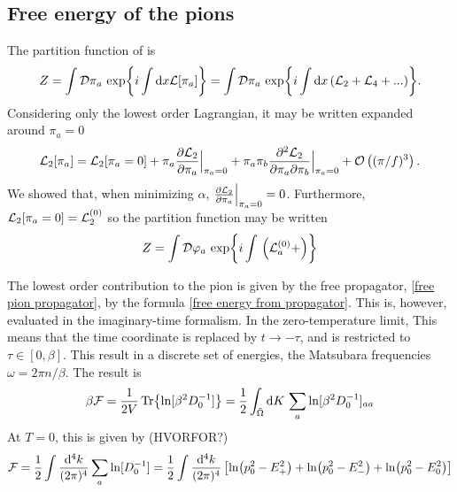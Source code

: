 \subsection{Free energy of the pions}
The partition function of \chpt is 
\begin{equation}
    Z = \int \D \pi_a \, \exp{i \int \dd x \Ell[\pi_a]}
    = 
    \int \D \pi_a \, \exp{i \int \dd x \left(\Ell_2 + \Ell_4 + ... \right)}.
\end{equation}
Considering only the lowest order Lagrangian, it may be written expanded around $\pi_a = 0$
\begin{equation}
    \Ell_2[\pi_a] 
    = \Ell_2[\pi_a = 0] 
    + \pi_a  \pdv{\Ell_2}{\pi_a}\Big|_{\pi_a=0}
    + \pi_a \pi_b \pdv[2]{\Ell_2}{\pi_a}{\pi_b}\Big|_{\pi_a=0}
    + \Oh[3]{(\pi/f)}.
\end{equation}
We showed that, when minimizing $\alpha$, $\pdv{\Ell_2}{\pi_a}\Big|_{\pi_a=0} = 0$. 
Furthermore, $\Ell_2[\pi_a = 0] = \Ell_2^{(0)}$ so the partition function may be written
\begin{equation}
    Z = \int \D \varphi_a \, 
    \exp{i \int \, \left( \Ell_a^{(0)} +  \right)}
\end{equation}


The lowest order contribution to the pion is given by the free propagator, \autoref{free pion propagator}, by the formula \autoref{free energy from propagator}.
This is, however, evaluated in the imaginary-time formalism.
In the zero-temperature limit, 
This means that the time coordinate is replaced by $t \rightarrow - \tau$, and is restricted to $\tau \in [0, \beta]$.
This result in a discrete set of energies, the Matsubara frequencies $\omega = 2 \pi n / \beta$.
The result is
\begin{equation}
    \beta \Ef = \frac{1}{2V} \Tr{\ln[\beta^2 D_0^{-1}]} 
    = \frac{1}{2} \int_{\tilde \Omega} \dd K \, \sum_a \ln[\beta^2 D_0^{-1}]_{aa}
\end{equation}
At $T = 0$, this is given by (HVORFOR?)
\begin{equation}
    \Ef = \frac{1}{2} \int \frac{\dd^4 k}{(2 \pi)^4} \sum_a \ln[D_0^{-1}]
    = \frac{1}{2} \int \frac{\dd^4 k}{(2 \pi)^4} 
    \left[\ln(p_0^2 - E_+^2) +  \ln(p_0^2 - E_-^2) + \ln(p_0^2 - E_0^2) \right]
\end{equation}

